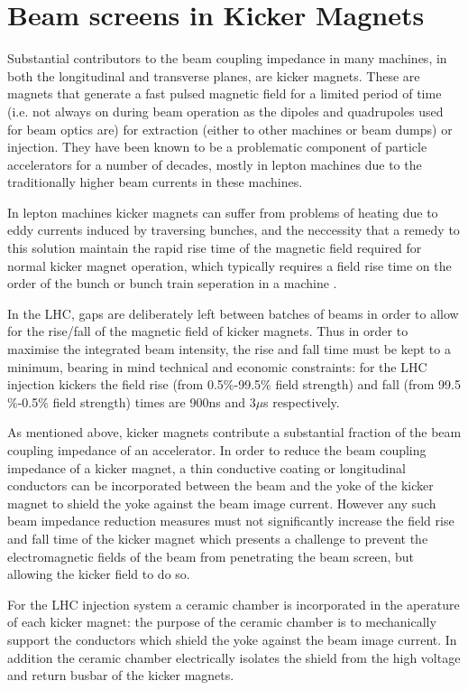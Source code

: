 \section{Beam screens in Kicker Magnets}
\label{sec:beam_screens}

Substantial contributors to the beam coupling impedance in many machines, in both the longitudinal and transverse planes, are kicker magnets. These are magnets that generate a fast pulsed magnetic field for a limited period of time (i.e. not always on during beam operation as the dipoles and quadrupoles used for beam optics are) for extraction (either to other machines or beam dumps) or injection. They have been known to be a problematic component of particle accelerators for a number of decades, mostly in lepton machines due to the traditionally higher beam currents in these machines.

In lepton machines kicker magnets can suffer from problems of heating due to eddy currents induced by traversing bunches, and the neccessity that a remedy to this solution maintain the rapid rise time of the magnetic field required for normal kicker magnet operation, which typically requires a field rise time on the order of the bunch or bunch train seperation in a machine \cite{Caspers:ThinCondLayers}. 

In the LHC, gaps are deliberately left between batches of beams in order to allow for the rise/fall of the magnetic field of kicker magnets. Thus in order to maximise the integrated beam intensity, the rise and fall time must be kept to a minimum, bearing in mind technical and economic constraints: for the LHC injection kickers the field rise (from 0.5$\%$-99.5$\%$ field strength) and fall (from 99.5$\%$-0.5$\%$ field strength) times are 900ns and 3$\mu$s respectively.

As mentioned above, kicker magnets contribute a substantial fraction of the beam coupling impedance of an accelerator. In order to reduce the beam coupling impedance of a kicker magnet, a thin conductive coating or longitudinal conductors can be incorporated between the beam and the yoke of the kicker magnet to shield the yoke against the beam image current. However any such beam impedance reduction measures must not significantly increase the field rise and fall time of the kicker magnet which presents a challenge to prevent the electromagnetic fields of the beam from penetrating the beam screen, but allowing the kicker field to do so.

For the LHC injection system a ceramic chamber is incorporated in the aperature of each kicker magnet: the purpose of the ceramic chamber is to mechanically support the conductors which shield the yoke against the beam image current. In addition the ceramic chamber electrically isolates the shield from the high voltage and return busbar of the kicker magnets.


